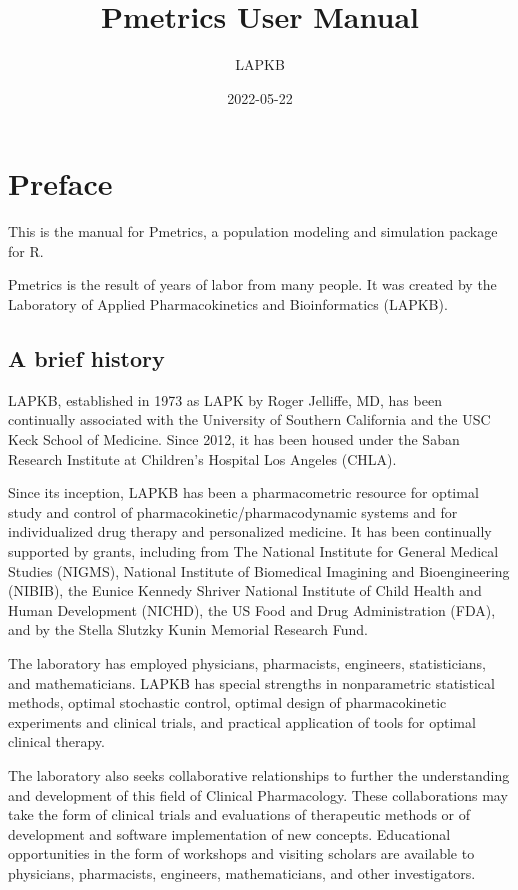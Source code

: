 \documentclass[
]{book}
\title{Pmetrics User Manual}
\author{LAPKB}
\date{2022-05-22}
\begin{document}
\maketitle

{
\setcounter{tocdepth}{1}
\tableofcontents
}
\hypertarget{preface}{%
\chapter{Preface}\label{preface}}

This is the manual for Pmetrics, a population modeling and simulation package for R.

Pmetrics is the result of years of labor from many people. It was created by the Laboratory of Applied Pharmacokinetics and Bioinformatics (LAPKB).

\hypertarget{a-brief-history}{%
\section{A brief history}\label{a-brief-history}}

LAPKB, established in 1973 as LAPK by Roger Jelliffe, MD, has been continually associated with the University of Southern California and the USC Keck School of Medicine. Since 2012, it has been housed under the Saban Research Institute at Children's Hospital Los Angeles (CHLA).

Since its inception, LAPKB has been a pharmacometric resource for optimal study and control of pharmacokinetic/pharmacodynamic systems and for individualized drug therapy and personalized medicine. It has been continually supported by grants, including from The National Institute for General Medical Studies (NIGMS), National Institute of Biomedical Imagining and Bioengineering (NIBIB), the Eunice Kennedy Shriver National Institute of Child Health and Human Development (NICHD), the US Food and Drug Administration (FDA), and by the Stella Slutzky Kunin Memorial Research Fund.

The laboratory has employed physicians, pharmacists, engineers, statisticians, and mathematicians. LAPKB has special strengths in nonparametric statistical methods, optimal stochastic control, optimal design of pharmacokinetic experiments and clinical trials, and practical application of tools for optimal clinical therapy.

The laboratory also seeks collaborative relationships to further the understanding and development of this field of Clinical Pharmacology. These collaborations may take the form of clinical trials and evaluations of therapeutic methods or of development and software implementation of new concepts. Educational opportunities in the form of workshops and visiting scholars are available to physicians, pharmacists, engineers, mathematicians, and other investigators.
\end{document}

